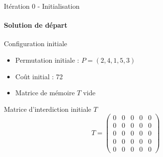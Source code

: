 \documentclass{beamer}
\begin{document}
\begin{frame}{Itération 0 - Initialisation}
    \framesubtitle{Solution de départ}

    \begin{block}{Configuration initiale}
        \begin{itemize}
            \item Permutation initiale : \( P = (2, 4, 1, 5, 3) \)
            \item Coût initial : 72
            \item Matrice de mémoire \( T \) vide
        \end{itemize}
    \end{block}

    \begin{exampleblock}{Matrice d'interdiction initiale \( T \)}
        \[
            T = \begin{pmatrix}
                0 & 0 & 0 & 0 & 0 \\
                0 & 0 & 0 & 0 & 0 \\
                0 & 0 & 0 & 0 & 0 \\
                0 & 0 & 0 & 0 & 0 \\
                0 & 0 & 0 & 0 & 0
            \end{pmatrix}
        \]
    \end{exampleblock}
\end{frame}
\end{document}
